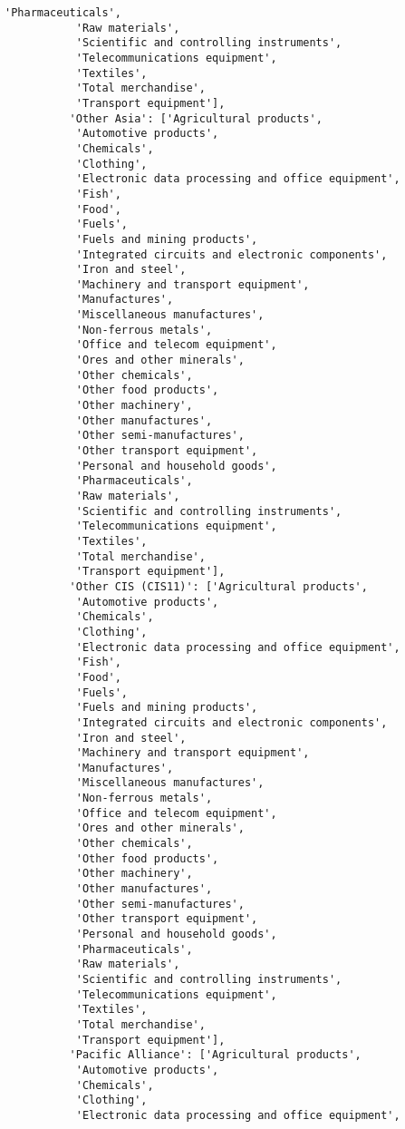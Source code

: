 \documentclass[11pt]{article}
\begin{document}
\begin{Verbatim}[commandchars=\\\{\}]
           'Pharmaceuticals',
           'Raw materials',
           'Scientific and controlling instruments',
           'Telecommunications equipment',
           'Textiles',
           'Total merchandise',
           'Transport equipment'],
          'Other Asia': ['Agricultural products',
           'Automotive products',
           'Chemicals',
           'Clothing',
           'Electronic data processing and office equipment',
           'Fish',
           'Food',
           'Fuels',
           'Fuels and mining products',
           'Integrated circuits and electronic components',
           'Iron and steel',
           'Machinery and transport equipment',
           'Manufactures',
           'Miscellaneous manufactures',
           'Non-ferrous metals',
           'Office and telecom equipment',
           'Ores and other minerals',
           'Other chemicals',
           'Other food products',
           'Other machinery',
           'Other manufactures',
           'Other semi-manufactures',
           'Other transport equipment',
           'Personal and household goods',
           'Pharmaceuticals',
           'Raw materials',
           'Scientific and controlling instruments',
           'Telecommunications equipment',
           'Textiles',
           'Total merchandise',
           'Transport equipment'],
          'Other CIS (CIS11)': ['Agricultural products',
           'Automotive products',
           'Chemicals',
           'Clothing',
           'Electronic data processing and office equipment',
           'Fish',
           'Food',
           'Fuels',
           'Fuels and mining products',
           'Integrated circuits and electronic components',
           'Iron and steel',
           'Machinery and transport equipment',
           'Manufactures',
           'Miscellaneous manufactures',
           'Non-ferrous metals',
           'Office and telecom equipment',
           'Ores and other minerals',
           'Other chemicals',
           'Other food products',
           'Other machinery',
           'Other manufactures',
           'Other semi-manufactures',
           'Other transport equipment',
           'Personal and household goods',
           'Pharmaceuticals',
           'Raw materials',
           'Scientific and controlling instruments',
           'Telecommunications equipment',
           'Textiles',
           'Total merchandise',
           'Transport equipment'],
          'Pacific Alliance': ['Agricultural products',
           'Automotive products',
           'Chemicals',
           'Clothing',
           'Electronic data processing and office equipment',

\end{Verbatim}
\end{document}

